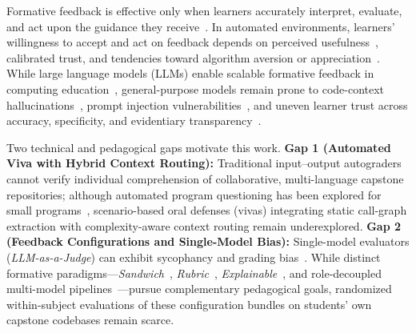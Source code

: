 \documentclass{llncs}
\begin{document}
Formative feedback is effective only when learners accurately interpret, evaluate, and act upon the guidance they receive~\cite{hattie2007power,shute2008focus,carless2018feedback,winstone2017supporting}. In automated environments, learners' willingness to accept and act on feedback depends on perceived usefulness~\cite{davis1989perceived,venkatesh2003user}, calibrated trust, and tendencies toward algorithm aversion or appreciation~\cite{lee2004trust,dietvorst2015algorithm,logg2019algorithm}. While large language models (LLMs) enable scalable formative feedback in computing education~\cite{kasneci2023chatgpt,denny2024computing,dai2023can}, general-purpose models remain prone to code-context hallucinations~\cite{hellas2023exploring,kiesler2023exploring}, prompt injection vulnerabilities~\cite{liffiton2023codehelp}, and uneven learner trust across accuracy, specificity, and evidentiary transparency~\cite{escalante2023ai,zhang2024students,nazaretsky2024ai,er2025assessing}.

Two technical and pedagogical gaps motivate this work. \textbf{Gap 1 (Automated Viva with Hybrid Context Routing):} Traditional input--output autograders cannot verify individual comprehension of collaborative, multi-language capstone repositories; although automated program questioning has been explored for small programs~\cite{lehtinen2021lets}, scenario-based oral defenses (vivas) integrating static call-graph extraction with complexity-aware context routing remain underexplored. \textbf{Gap 2 (Feedback Configurations and Single-Model Bias):} Single-model evaluators (\textit{LLM-as-a-Judge}) can exhibit sycophancy and grading bias~\cite{zheng2023judging}. While distinct formative paradigms—\textit{Sandwich}~\cite{parkes2013feedback}, \textit{Rubric}~\cite{jonsson2007use}, \textit{Explainable}~\cite{khosravi2022explainable}, and role-decoupled multi-model pipelines~\cite{du2024improving,zheng2023judging}—pursue complementary pedagogical goals, randomized within-subject evaluations of these configuration bundles on students' own capstone codebases remain scarce.
\end{document}
